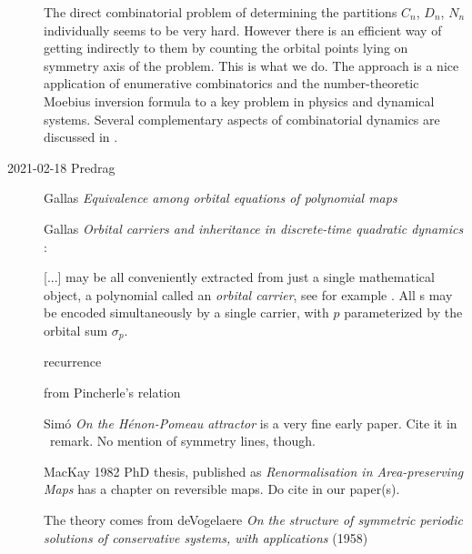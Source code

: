 \begin{description}
The direct combinatorial problem of determining the partitions  $C_n$,
$D_n$, $N_n$  individually seems to be very hard. However there is an
efficient way of getting indirectly to them by counting the orbital
points lying on symmetry axis of the problem. This is what we do. The
approach is a nice application of enumerative combinatorics and the
number-theoretic Moebius inversion formula to a key problem in physics
and dynamical systems. Several complementary aspects of combinatorial
dynamics are discussed in .

\item[2021-02-18 Predrag]

Gallas
{\em Equivalence among orbital equations of polynomial maps}

Gallas {\em Orbital carriers and
inheritance in discrete-time quadratic dynamics} :

[...] may be all conveniently extracted from
just a single mathematical object, a polynomial called an
{\sl orbital carrier}, see for example .
All {\orbit}s may be encoded simultaneously by a single carrier,
with $p$ {\orbit} parameterized by the orbital sum $\sigma_p$.

recurrence

from  Pincherle's relation%


Sim{\'o} {\em On the {H{\'e}non-Pomeau} attractor}
is a very fine early paper. Cite it in \Henon\ remark.
No mention of symmetry lines, though.

MacKay 1982 PhD thesis, published as
{\em Renormalisation in Area-preserving Maps} has a chapter on
reversible maps. Do cite in our paper(s).

The theory comes from deVogelaere {\em On the structure
of symmetric periodic solutions of conservative systems, with
applications} (1958)

\end{description}

